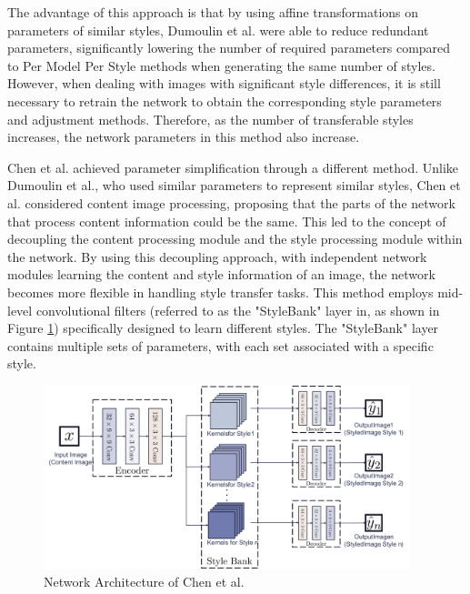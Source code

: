 \documentclass[preprint,12pt]{elsarticle}
\begin{document}
The advantage of this approach is that by using affine transformations on parameters of similar styles, Dumoulin et al. were able to reduce redundant parameters, significantly lowering the number of required parameters compared to Per Model Per Style methods when generating the same number of styles. However, when dealing with images with significant style differences, it is still necessary to retrain the network to obtain the corresponding style parameters and adjustment methods. Therefore, as the number of transferable styles increases, the network parameters in this method also increase.

Chen et al.\citep{40chen2017stylebank} achieved parameter simplification through a different method. Unlike Dumoulin et al.\citep{39dumoulin2016learned}, who used similar parameters to represent similar styles, Chen et al. \citep{40chen2017stylebank} considered content image processing, proposing that the parts of the network that process content information could be the same. This led to the concept of decoupling the content processing module and the style processing module within the network. By using this decoupling approach, with independent network modules learning the content and style information of an image, the network becomes more flexible in handling style transfer tasks. This method employs mid-level convolutional filters (referred to as the "StyleBank" layer in\citep{40chen2017stylebank}, as shown in Figure \ref{fig8_Chen}) specifically designed to learn different styles. The "StyleBank" layer contains multiple sets of parameters, with each set associated with a specific style.

\begin{figure}[!htbp]%
    \centering%
    \includegraphics[width=0.95\textwidth]{Figure_8__Network_Architecture_of_Chen_et_al_.pdf}
    \caption{Network Architecture of Chen et al.\citep{40chen2017stylebank}}\label{fig8_Chen}
\end{figure}
\end{document}
